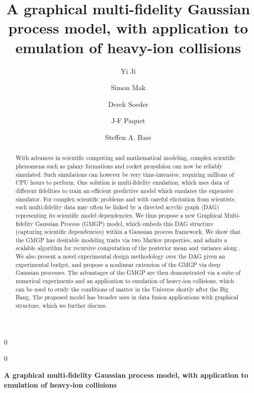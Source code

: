 \documentclass[12pt]{article}
\newcommand{\blind}{0}
\newcommand{\cbl}[1]{{\color{black}{#1}}}
\begin{document}
%

\def\spacingset#1{\renewcommand{\baselinestretch}%
{#1}\small\normalsize} \spacingset{1}



\blind
{
  \title{\bf A graphical multi-fidelity Gaussian process model, with application to emulation of heavy-ion collisions}
  \small
   \author[1]{Yi Ji}
    \author[1]{Simon Mak}
    \author[2]{Derek Soeder}
    \author[2,3]{J-F Paquet}
    \author[2]{Steffen A. Bass}
  \maketitle
} \fi

\blind
{
  \bigskip
  \bigskip
  \bigskip
  \begin{center}
    {\LARGE\bf A graphical multi-fidelity Gaussian process model, with application to emulation of heavy-ion collisions}
\end{center}

  \medskip
} \fi

\bigskip
\begin{abstract}
With advances in scientific computing and mathematical modeling, complex scientific phenomena such as galaxy formations and rocket propulsion can now be reliably simulated. Such simulations can however be very time-intensive, requiring millions of CPU hours to perform. One solution is multi-fidelity emulation, which uses data of different fidelities to train an efficient predictive model which emulates the expensive simulator. For complex scientific problems and with careful elicitation from scientists, such multi-fidelity data may often be linked by a directed acyclic graph (DAG) representing its scientific model dependencies. We thus propose a new Graphical Multi-fidelity Gaussian Process (GMGP) model, which embeds this DAG structure (capturing scientific dependencies) within a Gaussian process framework. We show that the GMGP has desirable modeling traits via two Markov properties, and admits a scalable algorithm for recursive computation of the posterior mean and variance along \cbl{at each depth level of the DAG}. We also present a novel experimental design methodology over the DAG given an experimental budget, and propose a nonlinear extension of the GMGP via deep Gaussian processes. The advantages of the GMGP are then demonstrated via a suite of numerical experiments and an application to emulation of heavy-ion collisions, which can be used to study the conditions of matter in the Universe shortly after the Big Bang. The proposed model has broader uses in data fusion applications with graphical structure, which we further discuss.
\end{abstract}
\end{document}
